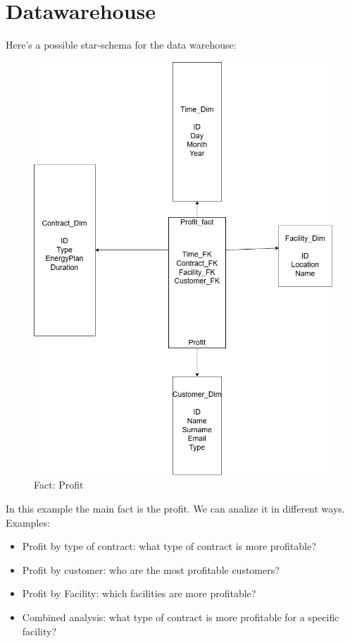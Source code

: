 \section{Datawarehouse}

Here's a possible star-schema for the data warehouse:


\begin{figure}[H]
    \centering
    \includegraphics[width=\textwidth,height=0.7\textheight]{images/Fact1.png}
    \caption{Fact: Profit}
\end{figure}

\noindent In this example the main fact is the profit. We can analize it in different ways. Examples:
\begin{itemize}
    \item Profit by type of contract: what type of contract is more profitable?
    \item Profit by customer: who are the most profitable customers?
    \item Profit by Facility: which facilities are more profitable?
    \item Combined analysis: what type of contract is more profitable for a specific facility?
\end{itemize}

